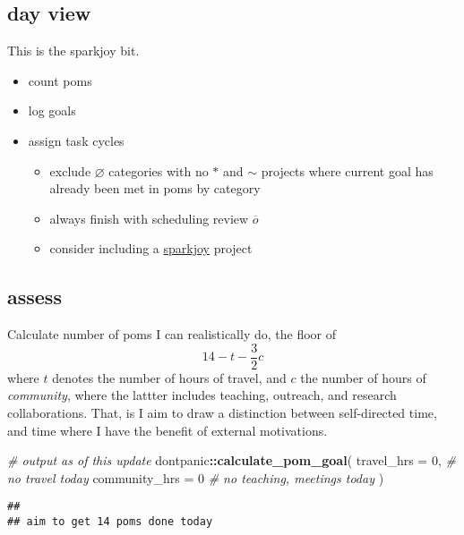 \documentclass[]{book}
\newenvironment{Shaded}{\begin{snugshade}}{\end{snugshade}}
\newcommand{\CommentTok}[1]{\textcolor[rgb]{0.56,0.35,0.01}{\textit{#1}}}
\newcommand{\DataTypeTok}[1]{\textcolor[rgb]{0.13,0.29,0.53}{#1}}
\newcommand{\DecValTok}[1]{\textcolor[rgb]{0.00,0.00,0.81}{#1}}
\newcommand{\KeywordTok}[1]{\textcolor[rgb]{0.13,0.29,0.53}{\textbf{#1}}}
\newcommand{\NormalTok}[1]{#1}
\newcommand{\OperatorTok}[1]{\textcolor[rgb]{0.81,0.36,0.00}{\textbf{#1}}}
\providecommand{\tightlist}{%
  \setlength{\itemsep}{0pt}\setlength{\parskip}{0pt}}
\begin{document}
\hypertarget{day-view-1}{%
\subsection{day view}\label{day-view-1}}

This is the sparkjoy bit.

\begin{itemize}
\tightlist
\item
  count poms
\item
  log goals
\item
  assign task cycles

  \begin{itemize}
  \tightlist
  \item
    exclude \(\varnothing\) categories with no \(*\) and \(\sim\) projects where current goal has already been met in poms by category
  \item
    always finish with scheduling review \(\overline o\)
  \item
    consider including a \href{https://en.wikipedia.org/wiki/Marie_Kondo}{sparkjoy} project
  \end{itemize}
\end{itemize}

\hypertarget{assess}{%
\subsection{assess}\label{assess}}

Calculate number of poms I can realistically do, the floor of
\[
14 - t - \frac 3 2 c
\]
where \(t\) denotes the number of hours of travel, and \(c\) the number of hours of \emph{community}, where the lattter includes teaching, outreach, and research collaborations. That, is I aim to draw a distinction between self-directed time, and time where I have the benefit of external motivations.

\begin{Shaded}
\begin{Highlighting}[]
\CommentTok{# output as of this update}
\NormalTok{dontpanic}\OperatorTok{::}\KeywordTok{calculate_pom_goal}\NormalTok{(}
  \DataTypeTok{travel_hrs =} \DecValTok{0}\NormalTok{, }\CommentTok{# no travel today}
  \DataTypeTok{community_hrs =} \DecValTok{0} \CommentTok{# no teaching, meetings today}
\NormalTok{)}
\end{Highlighting}
\end{Shaded}

\begin{verbatim}
## 
## aim to get 14 poms done today
\end{verbatim}
\end{document}
